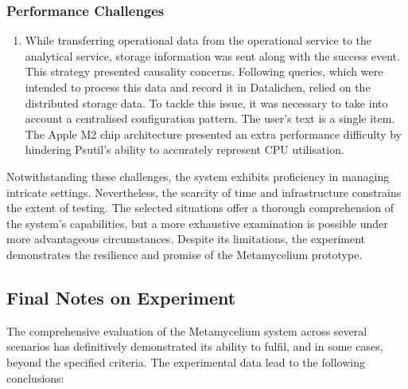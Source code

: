 \documentclass[journal]{IEEEtran}
\begin{document}
\subsubsection{Performance Challenges} 
\begin{enumerate}
    \item While transferring operational data from the operational service to the analytical service, storage information was sent along with the success event. This strategy presented causality concerns. Following queries, which were intended to process this data and record it in Datalichen, relied on the distributed storage data. To tackle this issue, it was necessary to take into account a centralised configuration pattern.
    The user's text is a single item. The Apple M2 chip architecture presented an extra performance difficulty by hindering Psutil's ability to accurately represent CPU utilisation.
\end{enumerate}

Notwithstanding these challenges, the system exhibits proficiency in managing intricate settings. Nevertheless, the scarcity of time and infrastructure constrains the extent of testing. The selected situations offer a thorough comprehension of the system's capabilities, but a more exhaustive examination is possible under more advantageous circumstances. Despite its limitations, the experiment demonstrates the resilience and promise of the Metamycelium prototype.



\subsection{Final Notes on Experiment}

The comprehensive evaluation of the Metamycelium system across several scenarios has definitively demonstrated its ability to fulfil, and in some cases, beyond the specified criteria. The experimental data lead to the following conclusions:
\end{document}
